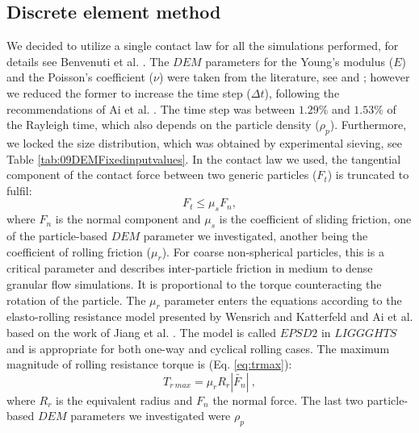 \documentclass{llncs}
\begin{document}
\subsection{Discrete element method}
\label{subsec:dem}

We decided to utilize a single
contact law for all the simulations performed, for details see
Benvenuti et al. \cite{RefWorks:180}.
The $DEM$ parameters for the Young's modulus ($E$) and the Poisson's coefficient
($\nu$) were taken from the literature, see \cite{RefWorks:175} 
and \cite{RefWorks:176}; however we reduced the former to increase the time step
($\Delta t$), following the recommendations of Ai et al. \cite{RefWorks:131}.
The time step was between $1.29 \%$ and $1.53 \%$ of the Rayleigh time, which
also depends on the particle density ($\rho_p$).
Furthermore, we locked the size distribution, which was obtained by experimental
sieving, see Table \ref{tab:09DEMFixedinputvalues}.
In the contact law we used, 
the tangential component of the contact force between two generic particles
($F_t$) is truncated to fulfil:
\begin{equation}
F_{t} \leq \mu_s F_{n},
 \label{eq:force_t}
\end{equation}
where $F_n$ is the normal component and $\mu_s$ is the coefficient of sliding
friction, one of the particle-based $DEM$ parameter we investigated, 
another being the coefficient of rolling friction ($\mu_r$). 
For coarse non-spherical particles, this is a critical parameter and describes
inter-particle friction in medium to dense granular flow simulations. It is proportional to the 
torque counteracting the rotation of the particle. The $\mu_r$ parameter enters the 
equations according to the elasto-rolling resistance model presented by Wensrich and 
Katterfeld \cite{RefWorks:87} and Ai et al. \cite{RefWorks:131} 
based on the work of Jiang et al. \cite{RefWorks:143}. 
The model is called $EPSD2$ in $LIGGGHTS$ and is appropriate for both one-way and cyclical rolling cases.
The maximum magnitude of rolling resistance torque is (Eq. \ref{eq:trmax}):
\begin{equation}
T_{r~max} = \mu_r R_r |\tilde{F_n}| ~,
 \label{eq:trmax}
\end{equation}
where $R_r$ is the equivalent radius and $F_n$ the normal force.
The last two particle-based $DEM$ parameters we investigated were $\rho_p$
\end{document}
